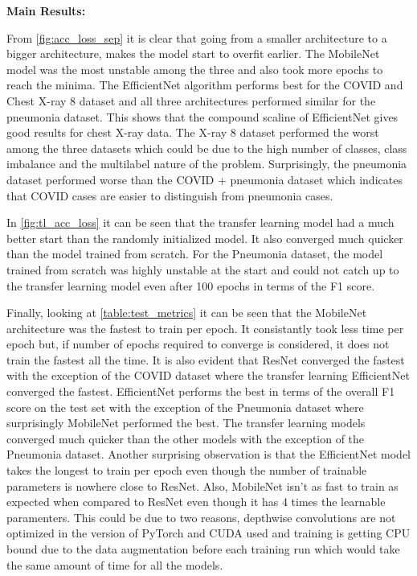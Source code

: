 \documentclass[10pt,twocolumn,letterpaper]{article}
\begin{document}
\textbf{Main Results:}

From \cref{fig:acc_loss_sep} it is clear that going from a smaller 
architecture to a bigger architecture, makes the model start to overfit earlier. 
The MobileNet model was the most unstable among the three and also took more epochs to reach 
the minima. The EfficientNet algorithm performs best for the COVID and Chest X-ray 8 
dataset and all three architectures performed similar for the pneumonia dataset. 
This shows that the compound scaline of EfficientNet gives good results for chest X-ray data.
The X-ray 8 dataset performed the worst among the three datasets which could be due to the 
high number of classes, class imbalance and the multilabel nature of the problem. 
Surprisingly, the pneumonia dataset performed worse than the COVID + pneumonia dataset 
which indicates that COVID cases are easier to distinguish from pneumonia cases. 

In \cref{fig:tl_acc_loss} it can be seen that the transfer learning model had a much better start than 
the randomly initialized model. It also converged much quicker than the model trained from scratch.
For the Pneumonia dataset, the model trained from scratch was highly unstable at the start 
and could not catch up to the transfer learning model even after 100 epochs in terms of the F1 score.

Finally, looking at \cref{table:test_metrics} it can be seen that the MobileNet architecture was 
the fastest to train per epoch. It consistantly took less time per epoch but, if number of 
epochs required to converge is considered, it does not train the fastest all the time.
It is also evident that ResNet converged the fastest with the exception of the COVID dataset where the 
transfer learning EfficientNet converged the fastest. EfficientNet performs the best in terms of the 
overall F1 score on the test set with the exception of the Pneumonia dataset where surprisingly 
MobileNet performed the best. The transfer learning models converged much quicker 
than the other models with the exception of the Pneumonia dataset. Another surprising observation 
is that the EfficientNet model takes the longest to train per epoch even though the number of trainable 
parameters is nowhere close to ResNet. Also, MobileNet isn't as fast to train as expected when 
compared to ResNet even though it has 4 times the learnable paramenters. This could be due to two 
reasons, depthwise convolutions are not optimized in the version of PyTorch and CUDA used and 
training is getting CPU bound due to the data augmentation before each training run which 
would take the same amount of time for all the models. 
\end{document}
